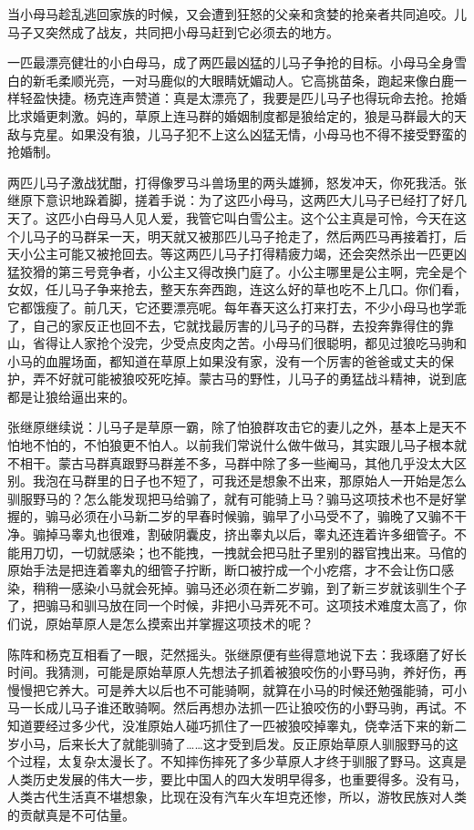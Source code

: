 \par 当小母马趁乱逃回家族的时候，又会遭到狂怒的父亲和贪婪的抢亲者共同追咬。儿马子又突然成了战友，共同把小母马赶到它必须去的地方。
\par 一匹最漂亮健壮的小白母马，成了两匹最凶猛的儿马子争抢的目标。小母马全身雪白的新毛柔顺光亮，一对马鹿似的大眼睛妩媚动人。它高挑苗条，跑起来像白鹿一样轻盈快捷。杨克连声赞道：真是太漂亮了，我要是匹儿马子也得玩命去抢。抢婚比求婚更刺激。妈的，草原上连马群的婚姻制度都是狼给定的，狼是马群最大的天敌与克星。如果没有狼，儿马子犯不上这么凶猛无情，小母马也不得不接受野蛮的抢婚制。
\par 两匹儿马子激战犹酣，打得像罗马斗兽场里的两头雄狮，怒发冲天，你死我活。张继原下意识地跺着脚，搓着手说：为了这匹小母马，这两匹大儿马子已经打了好几天了。这匹小白母马人见人爱，我管它叫白雪公主。这个公主真是可怜，今天在这个儿马子的马群呆一天，明天就又被那匹儿马子抢走了，然后两匹马再接着打，后天小公主可能又被抢回去。等这两匹儿马子打得精疲力竭，还会突然杀出一匹更凶猛狡猾的第三号竞争者，小公主又得改换门庭了。小公主哪里是公主啊，完全是个女奴，任儿马子争来抢去，整天东奔西跑，连这么好的草也吃不上几口。你们看，它都饿瘦了。前几天，它还要漂亮呢。每年春天这么打来打去，不少小母马也学乖了，自己的家反正也回不去，它就找最厉害的儿马子的马群，去投奔靠得住的靠山，省得让人家抢个没完，少受点皮肉之苦。小母马们很聪明，都见过狼吃马驹和小马的血腥场面，都知道在草原上如果没有家，没有一个厉害的爸爸或丈夫的保护，弄不好就可能被狼咬死吃掉。蒙古马的野性，儿马子的勇猛战斗精神，说到底都是让狼给逼出来的。
\par 张继原继续说：儿马子是草原一霸，除了怕狼群攻击它的妻儿之外，基本上是天不怕地不怕的，不怕狼更不怕人。以前我们常说什么做牛做马，其实跟儿马子根本就不相干。蒙古马群真跟野马群差不多，马群中除了多一些阉马，其他几乎没太大区别。我泡在马群里的日子也不短了，可我还是想象不出来，那原始人一开始是怎么驯服野马的？怎么能发现把马给骟了，就有可能骑上马？骟马这项技术也不是好掌握的，骟马必须在小马新二岁的早春时候骟，骟早了小马受不了，骟晚了又骟不干净。骟掉马睾丸也很难，割破阴囊皮，挤出睾丸以后，睾丸还连着许多细管子。不能用刀切，一切就感染；也不能拽，一拽就会把马肚子里别的器官拽出来。马倌的原始手法是把连着睾丸的细管子拧断，断口被拧成一个小疙瘩，才不会让伤口感染，稍稍一感染小马就会死掉。骟马还必须在新二岁骟，到了新三岁就该驯生个子了，把骟马和驯马放在同一个时候，非把小马弄死不可。这项技术难度太高了，你们说，原始草原人是怎么摸索出并掌握这项技术的呢？
\par 陈阵和杨克互相看了一眼，茫然摇头。张继原便有些得意地说下去：我琢磨了好长时间。我猜测，可能是原始草原人先想法子抓着被狼咬伤的小野马驹，养好伤，再慢慢把它养大。可是养大以后也不可能骑啊，就算在小马的时候还勉强能骑，可小马一长成儿马子谁还敢骑啊。然后再想办法抓一匹让狼咬伤的小野马驹，再试。不知道要经过多少代，没准原始人碰巧抓住了一匹被狼咬掉睾丸，侥幸活下来的新二岁小马，后来长大了就能驯骑了……这才受到启发。反正原始草原人驯服野马的这个过程，太复杂太漫长了。不知摔伤摔死了多少草原人才终于驯服了野马。这真是人类历史发展的伟大一步，要比中国人的四大发明早得多，也重要得多。没有马，人类古代生活真不堪想象，比现在没有汽车火车坦克还惨，所以，游牧民族对人类的贡献真是不可估量。
